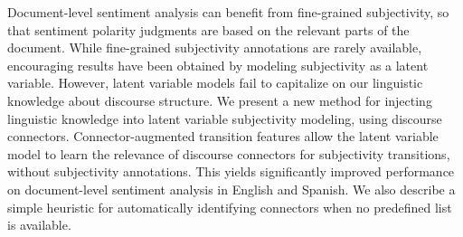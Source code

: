 Document-level sentiment analysis can benefit from fine-grained   subjectivity, so that sentiment polarity judgments are based on the
   relevant parts of the document. While fine-grained subjectivity
   annotations are rarely available, encouraging results have been
   obtained by modeling subjectivity as a latent variable. However,
   latent variable models fail to capitalize on our linguistic
   knowledge about discourse structure. We present a new method for
   injecting linguistic knowledge into latent variable subjectivity
   modeling, using discourse connectors. Connector-augmented
     transition features allow the latent variable model to learn the
   relevance of discourse connectors for subjectivity transitions,
   without subjectivity annotations.  This yields significantly
   improved performance on document-level sentiment analysis in English
   and Spanish. We also describe a simple heuristic for automatically
   identifying connectors when no predefined list is available.

